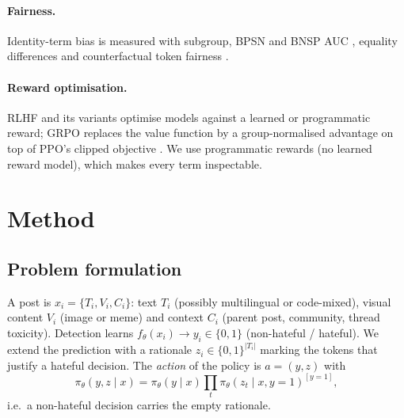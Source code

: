 \documentclass[11pt]{article}
\newcommand{\pihat}{\pi_\theta}
\begin{document}
\paragraph{Fairness.}
Identity-term bias is measured with subgroup, BPSN and BNSP AUC \citep{borkan2019nuanced}, equality differences
\citep{dixon2018bias} and counterfactual token fairness \citep{garg2019counterfactual}.

\paragraph{Reward optimisation.}
RLHF \citep{ouyang2022instructgpt} and its variants optimise models against a learned or programmatic reward; GRPO replaces the value
function by a group-normalised advantage \citep{shao2024deepseekmath} on top of PPO's clipped objective \citep{schulman2017ppo}. We use
programmatic rewards (no learned reward model), which makes every term inspectable.

\section{Method}\label{sec:method}
\subsection{Problem formulation}
A post is $x_i=\{T_i,V_i,C_i\}$: text $T_i$ (possibly multilingual or code-mixed), visual content $V_i$ (image or meme) and
context $C_i$ (parent post, community, thread toxicity). Detection learns $f_\theta(x_i)\to y_i\in\{0,1\}$ (non-hateful / hateful).
We extend the prediction with a rationale $z_i\in\{0,1\}^{|T_i|}$ marking the tokens that justify a hateful decision. The
\emph{action} of the policy is $a=(y,z)$ with
\begin{equation}
\pihat(y,z\mid x)=\pihat(y\mid x)\prod_{t}\pihat(z_t\mid x,y{=}1)^{[y=1]},
\end{equation}
i.e.\ a non-hateful decision carries the empty rationale.
\end{document}
